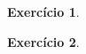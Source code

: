 \documentclass[letter,11pt]{article}
\newtheorem{exer}{Exercício}
\begin{document}
\begin{exer} \rm  %
% 
%
\end{exer}


\begin{exer} \rm  %
% 
% 
\end{exer}
\end{document}
